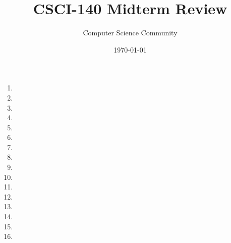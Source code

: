 \documentclass[11pt]{article}
\title{CSCI-140 Midterm Review}
\author{Computer Science Community}
\date{\today}
\begin{document}
\header
\begin{enumerate}

	\item 
	
	\item 
	\item 
	
	\item 
	
	\item 
	
	\item 

	\item 

	\item 

	\item 

	\item 

	\item 
	
	\item 
	
	\item 

	\item 

	\item 

	\item 


\end{enumerate}
\end{document}
